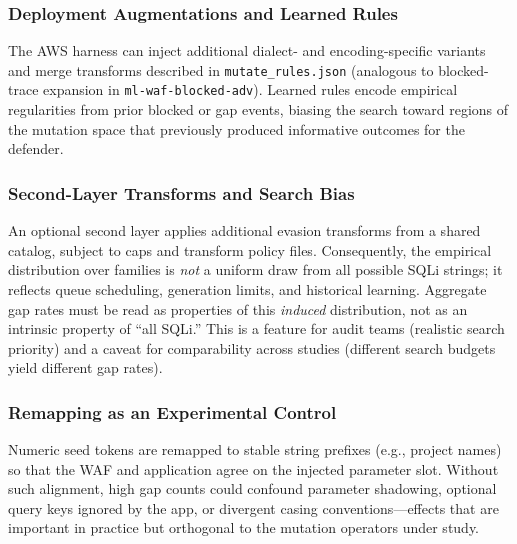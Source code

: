 \subsubsection{Deployment Augmentations and Learned Rules}
The AWS harness can inject additional dialect- and encoding-specific variants and merge transforms described in \texttt{mutate\_rules.json} (analogous to blocked-trace expansion in \texttt{ml-waf-blocked-adv}). Learned rules encode empirical regularities from prior blocked or gap events, biasing the search toward regions of the mutation space that previously produced informative outcomes for the defender.

\subsubsection{Second-Layer Transforms and Search Bias}
An optional second layer applies additional evasion transforms from a shared catalog, subject to caps and transform policy files. Consequently, the empirical distribution over families is \emph{not} a uniform draw from all possible SQLi strings; it reflects queue scheduling, generation limits, and historical learning. Aggregate gap rates must be read as properties of this \emph{induced} distribution, not as an intrinsic property of ``all SQLi.'' This is a feature for audit teams (realistic search priority) and a caveat for comparability across studies (different search budgets yield different gap rates).

\subsubsection{Remapping as an Experimental Control}
Numeric seed tokens are remapped to stable string prefixes (e.g., project names) so that the WAF and application agree on the injected parameter slot. Without such alignment, high gap counts could confound parameter shadowing, optional query keys ignored by the app, or divergent casing conventions---effects that are important in practice but orthogonal to the mutation operators under study.

